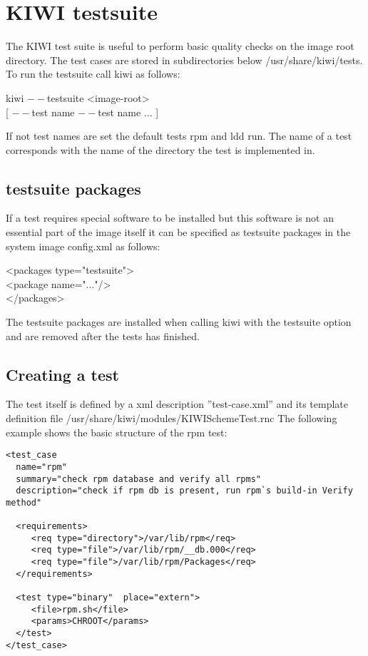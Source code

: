 \chapter{KIWI testsuite}
\label{chapter:testing}
\minitoc

The KIWI test suite is useful to perform basic quality checks on
the image root directory. The test cases are stored in subdirectories
below /usr/share/kiwi/tests. To run the testsuite call kiwi as
follows:

\begin{Command}{12cm}
 kiwi $--$testsuite <image-root> \bs \\
\hspace*{1cm}[ $--$test name $--$test name ... ]
\end{Command}

If not test names are set the default tests rpm and ldd run.
The name of a test corresponds with the name of the directory
the test is implemented in.

\section{testsuite packages}
If a test requires special software to be installed but this
software is not an essential part of the image itself it can be
specified as testsuite packages in the system image config.xml
as follows:

\begin{Command}{12cm}
<packages type="testsuite">\\
\hspace*{1cm}<package name="..."/>\\
</packages>
\end{Command}

The testsuite packages are installed when calling kiwi with
the testsuite option and are removed after the tests has
finished.

\section{Creating a test}
The test itself is defined by a xml description ''test-case.xml''
and its template definition file /usr/share/kiwi/modules/KIWISchemeTest.rnc
The following example shows the basic structure of the rpm test:

\begin{verbatim}
<test_case 
  name="rpm"
  summary="check rpm database and verify all rpms"
  description="check if rpm db is present, run rpm`s build-in Verify method"

  <requirements>
     <req type="directory">/var/lib/rpm</req>
     <req type="file">/var/lib/rpm/__db.000</req>
     <req type="file">/var/lib/rpm/Packages</req>
  </requirements>

  <test type="binary"  place="extern">
     <file>rpm.sh</file>
     <params>CHROOT</params>
  </test>
</test_case>
\end{verbatim}

